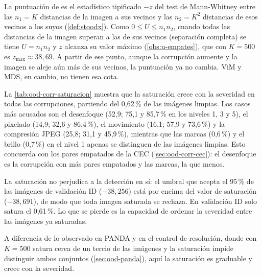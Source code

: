 La puntuación de \stoodx es el estadístico tipificado $-z$ del test de Mann-Whitney entre las $n_1 = K$ distancias de la imagen a sus vecinos y las $n_2 = K^2$ distancias de esos vecinos a los suyos (\cref{def:stoodx}). Como $0 \le U \le n_1 n_2$, cuando todas las distancias de la imagen superan a las de sus vecinos (separación completa) se tiene $U = n_1 n_2$ y $z$ alcanza su valor máximo (\cref{obs:u-empates}), que con $K = 500$ es $z_{\max} \approx 38{,}69$. A partir de ese punto, aunque la corrupción aumente y la imagen se aleje aún más de sus vecinos, la puntuación ya no cambia. ViM y MDS, en cambio, no tienen esa cota.



La \cref{tab:ood-corr-saturacion} muestra que la saturación crece con la severidad en todas las corrupciones, partiendo del 0,62\,\% de las imágenes limpias. Los casos más acusados son el desenfoque (52,9; 75,1 y 85,7\,\% en los niveles 1, 3 y 5), el pixelado (14,9; 32,6 y 86,4\,\%), el movimiento (16,1; 57,9 y 73,6\,\%) y la compresión JPEG (25,8; 31,1 y 45,9\,\%), mientras que las marcas (0,6\,\%) y el brillo (0,7\,\%) en el nivel 1 apenas se distinguen de las imágenes limpias. Esto concuerda con los pares empatados de la CEC (\cref{sec:ood-corr-cec}): el desenfoque es la corrupción con más pares empatados y las marcas, la que menos.

La saturación no perjudica a la detección en sí: el umbral que acepta el 95\,\% de las imágenes de validación ID ($-38{,}256$) está por encima del valor de saturación ($-38{,}691$), de modo que toda imagen saturada se rechaza. En validación ID solo satura el 0,61\,\%. Lo que se pierde es la capacidad de ordenar la severidad entre las imágenes ya saturadas.

A diferencia de lo observado en PANDA y en el control de resolución, donde con $K = 500$ satura cerca de un tercio de las imágenes y la saturación impide distinguir ambos conjuntos (\cref{sec:ood-panda}), aquí la saturación es graduable y crece con la severidad.

